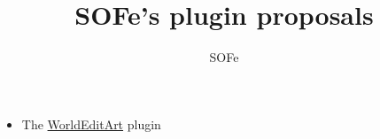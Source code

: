 \documentclass{article}
\title{SOFe's plugin proposals}
\author{SOFe}
\begin{document}
	\maketitle
	\begin{itemize}
		\item The \href{./WorldEditArt}{WorldEditArt} plugin
	\end{itemize}
\end{document}
